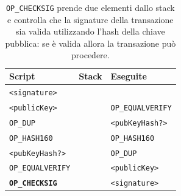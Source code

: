\begin{enumerate}[1.]
\begin{table}[H]
    \centering
    \begin{tabular}{p{3cm}|p{7.7cm}|p{3cm}}
        Script & Stack & Eseguite\\
        \hline
        \texttt{<signature>}              &  &\\
        \texttt{<publicKey>}              &  & \texttt{OP\_EQUALVERIFY}\\
        \texttt{OP\_DUP}                  &  & \texttt{<pubKeyHash?>}\\
        \texttt{OP\_HASH160}              &  & \texttt{OP\_HASH160}\\
        \texttt{<pubKeyHash?>}            &  & \texttt{OP\_DUP}\\
        \texttt{OP\_EQUALVERIFY}          &  & \texttt{<publicKey>}\\
        \texttt{\textbf{OP\_CHECKSIG}}    &  & \texttt{<signature>}\\
    \end{tabular}
    \caption{\texttt{OP\_CHECKSIG} prende due elementi dallo stack e controlla che la signature della transazione sia valida utilizzando l'hash della chiave pubblica: se è valida allora la transazione può procedere.}
\end{table}


\end{enumerate}
